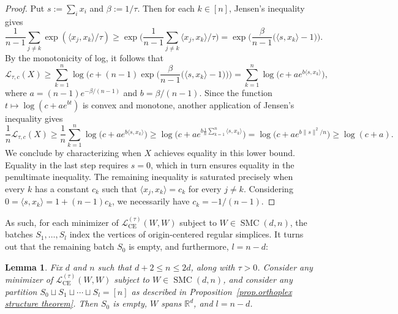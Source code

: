 \documentclass{article}
\theoremstyle{plain}
\newtheorem{lemma}[theorem]{Lemma}
\theoremstyle{definition}
\begin{document}
\begin{proof}
Put $s:=\sum_ix_i$ and $\beta:=1/\tau$.
Then for each $k\in[n]$, Jensen's inequality gives
\[
\frac{1}{n-1}\sum_{j\neq k}\exp(\langle x_j, x_k\rangle/\tau)
\geq \exp\bigg(\frac{1}{n-1}\sum_{j\neq k}\langle x_j, x_k\rangle/\tau\bigg)
=\exp\bigg(\frac{\beta}{n-1}\big(\langle s,x_k\rangle-1\big)\bigg).
\]
By the monotonicity of log, it follows that
\[
\mathcal{L}_{\tau,c}(X)
\geq\sum_{k=1}^n\log\bigg(c+(n-1)\exp\bigg(\frac{\beta}{n-1}\big(\langle s,x_k\rangle-1\big)\bigg)\bigg)
=\sum_{k=1}^n\log\big(c+ae^{b\langle s,x_k\rangle}\big),
\]
where $a=(n-1)e^{-\beta/(n-1)}$ and $b=\beta/(n-1)$.
Since the function $t\mapsto \log(c+ae^{bt})$ is convex and monotone, another application of Jensen's inequality gives
\[
\frac{1}{n}\mathcal{L}_{\tau,c}(X)
\geq\frac{1}{n}\sum_{k=1}^n\log\big(c+ae^{b\langle s,x_k\rangle}\big)
\geq \log\big(c+ae^{b\frac{1}{n}\sum_{k=1}^n\langle s,x_k\rangle}\big)
=\log\big(c+ae^{b\|s\|^2/n}\big)
\geq\log(c+a).
\]
We conclude by characterizing when $X$ achieves equality in this lower bound.
Equality in the last step requires $s=0$, which in turn ensures equality in the penultimate inequality.
The remaining inequality is saturated precisely when every $k$ has a constant $c_k$ such that $\langle x_j,x_k\rangle=c_k$ for every $j\neq k$.
Considering $0=\langle s,x_k\rangle=1+(n-1)c_k$, we necessarily have $c_k=-1/(n-1)$.
\end{proof}

As such, for each minimizer of $\mathcal{L}_{\operatorname{CE}}^{(\tau)}(W,W)$ subject to $W\in\operatorname{SMC}(d,n)$, the batches $S_1,\ldots,S_l$ index the vertices of origin-centered regular simplices.
It turns out that the remaining batch $S_0$ is empty, and furthermore, $l=n-d$:

\begin{lemma}
\label{lem.empty S_0}
Fix $d$ and $n$ such that $d+2\leq n \leq 2d$, along with $\tau>0$.
Consider any minimizer of $\mathcal{L}_{\operatorname{CE}}^{(\tau)}(W,W)$ subject to $W\in\operatorname{SMC}(d,n)$, and consider any partition $S_0\sqcup S_1\sqcup\cdots\sqcup S_l=[n]$ as described in Proposition~\ref{prop.orthoplex structure theorem}.
Then $S_0$ is empty, $W$ spans $\mathbb{R}^d$, and $l=n-d$.
\end{lemma}
\end{document}
